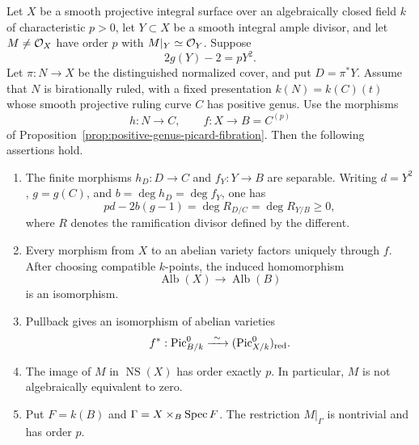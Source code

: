 \begin{proposition}\label{prop:positive-genus-picard-variety}
Let $X$ be a smooth projective integral surface over an algebraically
closed field $k$ of characteristic $p>0$, let $Y\subset X$ be a smooth
integral ample divisor, and let $M\ne\mathcal O_X$ have order $p$ with
$M|_Y\simeq\mathcal O_Y$. Suppose
\[
 2g(Y)-2=pY^2.
\]
Let $\pi:N\to X$ be the distinguished normalized cover, and put
$D=\pi^*Y$. Assume that $N$ is birationally ruled, with a fixed
presentation $k(N)=k(C)(t)$ whose smooth projective ruling curve
$C$ has positive genus. Use the morphisms
\[
 h:N\longrightarrow C,\qquad f:X\longrightarrow B=C^{(p)}
\]
of Proposition~\ref{prop:positive-genus-picard-fibration}.
Then the following assertions hold.
\begin{enumerate}[label=\textup{(\roman*)}]
\item The finite morphisms $h_D:D\to C$ and $f_Y:Y\to B$ are
separable. Writing $d=Y^2$, $g=g(C)$, and
$b=\deg h_D=\deg f_Y$, one has
\[
 pd-2b(g-1)=\deg R_{D/C}=\deg R_{Y/B}\geq0,
\]
where $R$ denotes the ramification divisor defined by the different.
\item Every morphism from $X$ to an abelian variety factors uniquely
through $f$. After choosing compatible $k$-points, the induced
homomorphism
\[
 \operatorname{Alb}(X)\longrightarrow\operatorname{Alb}(B)
\]
is an isomorphism.
\item Pullback gives an isomorphism of abelian varieties
\[
 f^*:\operatorname{Pic}^0_{B/k}
 \xrightarrow{\ \sim\ }(\operatorname{Pic}^0_{X/k})_{\mathrm{red}}.
\]
\item The image of $M$ in $\operatorname{NS}(X)$ has order
exactly $p$. In particular, $M$ is not algebraically equivalent
to zero.
\item Put $F=k(B)$ and $\Gamma=X\times_B\operatorname{Spec} F$. The restriction
$M|_\Gamma$ is nontrivial and has order $p$.
\end{enumerate}
\end{proposition}

